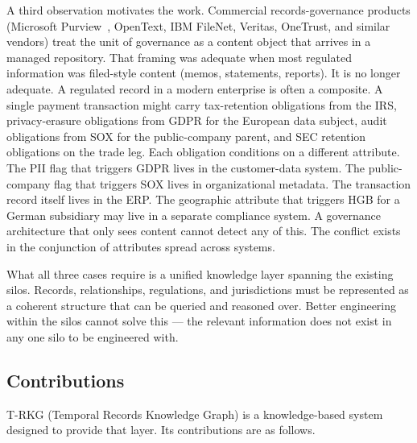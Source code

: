\documentclass{ieeeaccess}
\begin{document}
A third observation motivates the work. Commercial records-governance products (Microsoft Purview~\cite{purview}, OpenText, IBM FileNet, Veritas, OneTrust, and similar vendors) treat the unit of governance as a content object that arrives in a managed repository. That framing was adequate when most regulated information was filed-style content (memos, statements, reports). It is no longer adequate. A regulated record in a modern enterprise is often a composite. A single payment transaction might carry tax-retention obligations from the IRS, privacy-erasure obligations from GDPR for the European data subject, audit obligations from SOX for the public-company parent, and SEC retention obligations on the trade leg. Each obligation conditions on a different attribute. The PII flag that triggers GDPR lives in the customer-data system. The public-company flag that triggers SOX lives in organizational metadata. The transaction record itself lives in the ERP. The geographic attribute that triggers HGB for a German subsidiary may live in a separate compliance system. A governance architecture that only sees content cannot detect any of this. The conflict exists in the conjunction of attributes spread across systems.

What all three cases require is a unified knowledge layer spanning the existing silos. Records, relationships, regulations, and jurisdictions must be represented as a coherent structure that can be queried and reasoned over. Better engineering within the silos cannot solve this --- the relevant information does not exist in any one silo to be engineered with.

\subsection{Contributions}

T-RKG (Temporal Records Knowledge Graph) is a knowledge-based system designed to provide that layer. Its contributions are as follows.
\end{document}
